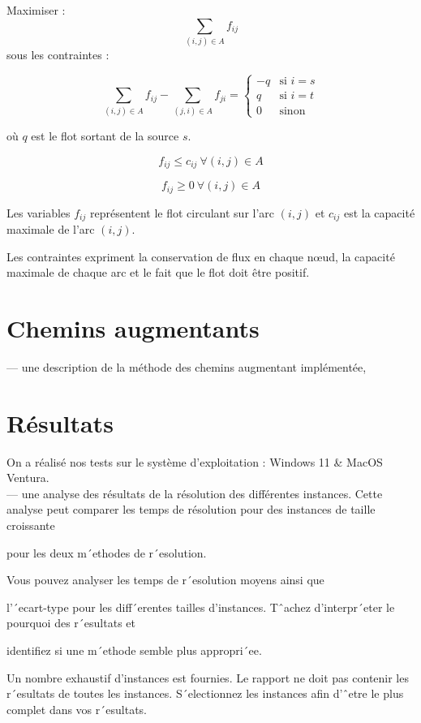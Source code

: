 \documentclass{article}
\begin{document}
Maximiser :
$$\sum_{(i,j) \in A} f_{ij}$$
sous les contraintes :

$$\sum_{(i,j) \in A} f_{ij} - \sum_{(j,i) \in A} f_{ji} =
\begin{cases}
-q & \text{si } i=s \\
q & \text{si } i=t \\
0 & \text{sinon}
\end{cases}$$

où $q$ est le flot sortant de la source $s$.


$$f_{ij} \leq c_{ij} ~ \forall (i,j) \in A$$

$$f_{ij} \geq 0 ~ \forall (i,j) \in A $$

Les variables $f_{ij}$ représentent le flot circulant sur l'arc $(i,j)$ et $c_{ij}$ est la capacité maximale de l'arc $(i,j)$.
    
Les contraintes expriment la conservation de flux en chaque nœud, la capacité maximale de chaque arc et le fait que le flot doit être positif.


\section{Chemins augmentants}

— une description de la méthode des chemins augmentant implémentée,


\section{Résultats}
    
 On a réalisé nos tests sur le système d’exploitation : Windows 11 \& MacOS Ventura.\\

— une analyse des résultats de la résolution des différentes instances.
   Cette analyse peut comparer les
temps de résolution
   pour des instances de taille croissante

   pour les deux m´ethodes de r´esolution.

Vous pouvez analyser
   les temps de r´esolution moyens ainsi que

   l’´ecart-type pour les diff´erentes tailles
d’instances.
   Tˆachez d’interpr´eter le pourquoi des r´esultats et

   identifiez si une m´ethode semble plus
appropri´ee.

Un nombre exhaustif d’instances est fournies. Le rapport ne doit pas contenir les r´esultats de toutes
les instances. S´electionnez les instances afin d’ˆetre le plus complet dans vos r´esultats.
\end{document}
